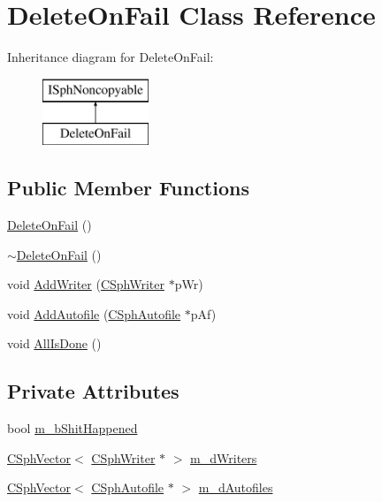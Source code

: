 \hypertarget{classDeleteOnFail}{\section{Delete\-On\-Fail Class Reference}
\label{classDeleteOnFail}
}
Inheritance diagram for Delete\-On\-Fail\-:\begin{figure}[H]
\begin{center}
\leavevmode
\includegraphics[height=2.000000cm]{classDeleteOnFail}
\end{center}
\end{figure}
\subsection*{Public Member Functions}
\begin{DoxyCompactItemize}
\item 
\hyperlink{classDeleteOnFail_afed6ea56768b24e3d9a2b4ad7ec428a0}{Delete\-On\-Fail} ()
\item 
\hyperlink{classDeleteOnFail_a7c71cc5843fa3b03858bca64690104b4}{$\sim$\-Delete\-On\-Fail} ()
\item 
void \hyperlink{classDeleteOnFail_afa5d7892d742e92944659b6517a63a65}{Add\-Writer} (\hyperlink{classCSphWriter}{C\-Sph\-Writer} $\ast$p\-Wr)
\item 
void \hyperlink{classDeleteOnFail_a845db0f928917836ae945bbb714fc857}{Add\-Autofile} (\hyperlink{classCSphAutofile}{C\-Sph\-Autofile} $\ast$p\-Af)
\item 
void \hyperlink{classDeleteOnFail_a58ed0dc3be16632058eb71ac0832dd1a}{All\-Is\-Done} ()
\end{DoxyCompactItemize}
\subsection*{Private Attributes}
\begin{DoxyCompactItemize}
\item 
bool \hyperlink{classDeleteOnFail_aedc3cf679b2d1132fbefb55901176f8c}{m\-\_\-b\-Shit\-Happened}
\item 
\hyperlink{classCSphVector}{C\-Sph\-Vector}$<$ \hyperlink{classCSphWriter}{C\-Sph\-Writer} $\ast$ $>$ \hyperlink{classDeleteOnFail_ad5410b6541b7149046f73615ff23d5fb}{m\-\_\-d\-Writers}
\item 
\hyperlink{classCSphVector}{C\-Sph\-Vector}$<$ \hyperlink{classCSphAutofile}{C\-Sph\-Autofile} $\ast$ $>$ \hyperlink{classDeleteOnFail_a5a24acb68805170e1dfa419a85ad062e}{m\-\_\-d\-Autofiles}
\end{DoxyCompactItemize}


